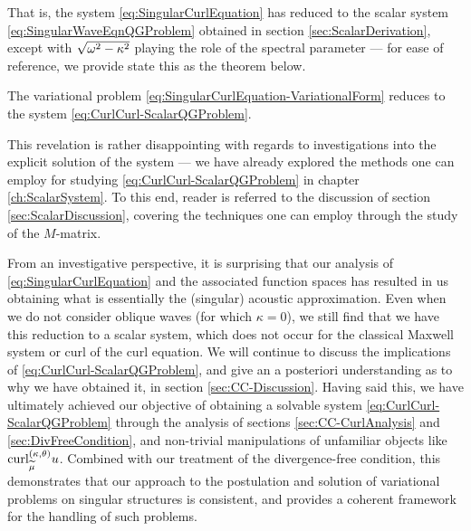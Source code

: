 That is, the system \eqref{eq:SingularCurlEquation} has reduced to the scalar system \eqref{eq:SingularWaveEqnQGProblem} obtained in section \ref{sec:ScalarDerivation}, except with $\sqrt{\omega^2-\kappa^2}$ playing the role of the spectral parameter --- for ease of reference, we provide state this as the theorem below.
\begin{theorem} \label{thm:CurlCurlReduction-Theorem}
	The variational problem \eqref{eq:SingularCurlEquation-VariationalForm} reduces to the system \eqref{eq:CurlCurl-ScalarQGProblem}.
\end{theorem}
This revelation is rather disappointing with regards to investigations into the explicit solution of the system --- we have already explored the methods one can employ for studying \eqref{eq:CurlCurl-ScalarQGProblem} in chapter \ref{ch:ScalarSystem}.
To this end, reader is referred to the discussion of section \ref{sec:ScalarDiscussion}, covering the techniques one can employ through the study of the $M$-matrix.

From an investigative perspective, it is surprising that our analysis of \eqref{eq:SingularCurlEquation} and the associated function spaces has resulted in us obtaining what is essentially the (singular) acoustic approximation.
Even when we do not consider oblique waves (for which $\kappa=0$), we still find that we have this reduction to a scalar system, which does not occur for the classical Maxwell system or curl of the curl equation.
We will continue to discuss the implications of \eqref{eq:CurlCurl-ScalarQGProblem}, and give an a posteriori understanding as to why we have obtained it, in section \ref{sec:CC-Discussion}.
Having said this, we have ultimately achieved our objective of obtaining a solvable system \eqref{eq:CurlCurl-ScalarQGProblem} through the analysis of sections \ref{sec:CC-CurlAnalysis} and \ref{sec:DivFreeCondition}, and non-trivial manipulations of unfamiliar objects like $\mathrm{curl}_{\widetilde{\mu}}^{\left( \kappa, \theta \right)}u$.
Combined with our treatment of the divergence-free condition, this demonstrates that our approach to the postulation and solution of variational problems on singular structures is consistent, and provides a coherent framework for the handling of such problems.

